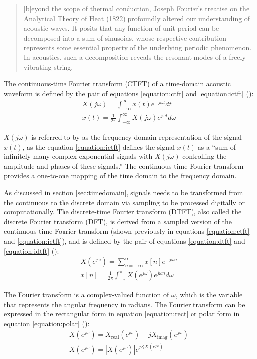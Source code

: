 \documentclass[report.tex]{subfiles}
\begin{document}
\begin{quote}
	[b]eyond the scope of thermal conduction, Joseph Fourier's treatise on the Analytical Theory of Heat (1822) profoundly altered our understanding of acoustic waves. It posits that any function of unit period can be decomposed into a sum of sinusoids, whose respective contribution represents some essential property of the underlying periodic phenomenon. In acoustics, such a decomposition reveals the resonant modes of a freely vibrating string.
\end{quote}

The continuous-time Fourier transform (CTFT) of a time-domain acoustic waveform is defined by the pair of equations \ref{equation:ctft} and \ref{equation:ictft} (\cite[Chapter~11]{dspfirst}):
\begin{align}
	X(j\omega) = \int_{-\infty}^{\infty}{x(t)e^{-j\omega t}\mathit{dt}} \tag{1}\label{equation:ctft} \\
	x(t) = \frac{1}{2\pi}\int_{-\infty}^{\infty}{X(j\omega)e^{j\omega t}\mathit{d\omega}} \tag{2}\label{equation:ictft}
\end{align}

$X(j\omega)$ is referred to by \textcite{dspfirst} as the frequency-domain representation of the signal $x(t)$, as the equation \ref{equation:ictft} defines the signal $x(t)$ as a ``sum of infinitely many complex-exponential signals with $X(j\omega)$ controlling the amplitude and phases of these signals.'' The continuous-time Fourier transform provides a one-to-one mapping of the time domain to the frequency domain.

As discussed in section \ref{sec:timedomain}, signals needs to be transformed from the continuous to the discrete domain via sampling to be processed digitally or computationally. The discrete-time Fourier transform (DTFT), also called the discrete Fourier transform (DFT), is derived from a sampled version of the continuous-time Fourier transform (shown previously in equations \ref{equation:ctft} and \ref{equation:ictft}), and is defined by the pair of equations \ref{equation:dtft} and \ref{equation:idtft} (\cite[Chapter~12]{melbook}):
\begin{align}
	X(e^{j\omega}) = \sum_{n = -\infty}^{\infty}{x[n]e^{-j\omega n}} \tag{3}\label{equation:dtft} \\
	x[n] = \frac{1}{2\pi}\int_{-\pi}^{\pi}{X(e^{j\omega})e^{j\omega n}\mathit{d\omega}} \tag{4}\label{equation:idtft}
\end{align}

The Fourier transform is a complex-valued function of $\omega$, which is the variable that represents the angular frequency in radians. The Fourier transform can be expressed in the rectangular form in equation \ref{equation:rect} or polar form in equation \ref{equation:polar} (\cite[Chapter~2]{discretebook}):
\begin{align}
	X(e^{j\omega}) = X_{\text{real}}(e^{j\omega}) + j X_{\text{imag}}(e^{j\omega}) \tag{5}\label{equation:rect} \\
	X(e^{j\omega}) = |X(e^{j\omega})|e^{j\measuredangle X(e^{j\omega})} \tag{6}\label{equation:polar}
\end{align}
\end{document}
